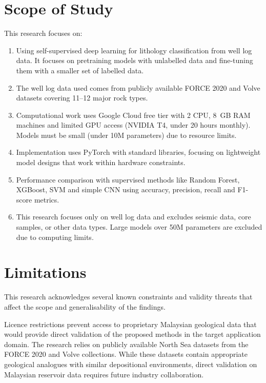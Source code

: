\section{Scope of Study}

This research focuses on:

\begin{enumerate}[label=\alph*)]
\item Using self-supervised deep learning for lithology classification from well log data. It focuses on pretraining models with unlabelled data and fine-tuning them with a smaller set of labelled data.

\item The well log data used comes from publicly available FORCE 2020 and Volve datasets covering 11--12 major rock types.

\item Computational work uses Google Cloud free tier with 2 CPU, 8~GB RAM machines and limited GPU access (NVIDIA T4, under 20 hours monthly). Models must be small (under 10M parameters) due to resource limits.

\item Implementation uses PyTorch with standard libraries, focusing on lightweight model designs that work within hardware constraints.

\item Performance comparison with supervised methods like Random Forest, XGBoost, SVM and simple CNN using accuracy, precision, recall and F1-score metrics.

\item This research focuses only on well log data and excludes seismic data, core samples, or other data types. Large models over 50M parameters are excluded due to computing limits.
\end{enumerate}


\section{Limitations}

This research acknowledges several known constraints and validity threats that affect the scope and generalisability of the findings.

Licence restrictions prevent access to proprietary Malaysian geological data that would provide direct validation of the proposed methods in the target application domain. The research relies on publicly available North Sea datasets from the FORCE 2020 and Volve collections. While these datasets contain appropriate geological analogues with similar depositional environments, direct validation on Malaysian reservoir data requires future industry collaboration.

